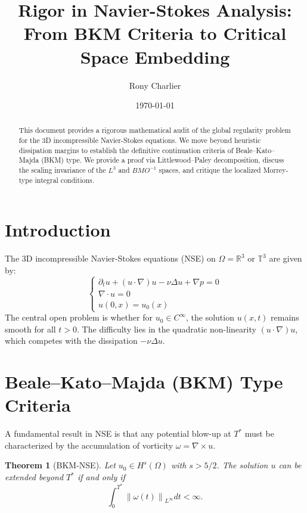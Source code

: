 \documentclass[11pt,a4paper]{amsart}
\title{Rigor in Navier-Stokes Analysis: \\ 
From BKM Criteria to Critical Space Embedding}
\author{Rony Charlier}
\date{\today}
\newtheorem{theorem}{Theorem}[section]
\newcommand{\norm}[1]{\left\|#1\right\|}
\newcommand{\R}{\mathbb{R}}
\newcommand{\T}{\mathbb{T}}
\begin{document}
\begin{abstract}
This document provides a rigorous mathematical audit of the global regularity problem for the 3D incompressible Navier-Stokes equations. We move beyond heuristic dissipation margins to establish the definitive continuation criteria of Beale--Kato--Majda (BKM) type. We provide a proof via Littlewood--Paley decomposition, discuss the scaling invariance of the $L^3$ and $BMO^{-1}$ spaces, and critique the localized Morrey-type integral conditions.
\end{abstract}

\maketitle

\section{Introduction}

The 3D incompressible Navier-Stokes equations (NSE) on $\Omega = \R^3$ or $\T^3$ are given by:
\begin{equation} \label{eq:nse}
\begin{cases}
\partial_t u + (u \cdot \nabla) u - \nu \Delta u + \nabla p = 0 \\
\nabla \cdot u = 0 \\
u(0, x) = u_0(x)
\end{cases}
\end{equation}
The central open problem is whether for $u_0 \in C^\infty$, the solution $u(x,t)$ remains smooth for all $t > 0$. The difficulty lies in the quadratic non-linearity $(u \cdot \nabla) u$, which competes with the dissipation $-\nu \Delta u$.

\section{Beale--Kato--Majda (BKM) Type Criteria}

A fundamental result in NSE is that any potential blow-up at $T^*$ must be characterized by the accumulation of vorticity $\omega = \nabla \times u$.

\begin{theorem}[BKM-NSE]
Let $u_0 \in H^s(\Omega)$ with $s > 5/2$. The solution $u$ can be extended beyond $T^*$ if and only if
\begin{equation}
\int_0^{T^*} \norm{\omega(t)}_{L^\infty} dt < \infty.
\end{equation}
\end{theorem}
\end{document}
